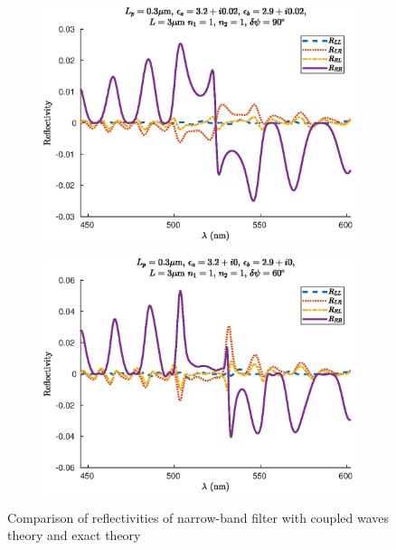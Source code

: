 \begin{figure}
\begin{subfigure}{0.49\linewidth}
		\includegraphics[width=\linewidth]{plots/defect/reflectivity_losses/comparison_reflection}
		\caption{}
	\end{subfigure}
	\begin{subfigure}{0.49\linewidth}
		\includegraphics[width=\linewidth]{plots/defect/reflectivity_other_defect/comparison_reflection}
		\caption{}
	\end{subfigure}
	\caption[Comparison of reflectivity of the narrow-band filter]{Comparison of reflectivities of narrow-band filter with coupled waves theory and exact theory}
	\label{fig:reflectivities_narrow_appendix_comp}
\end{figure}